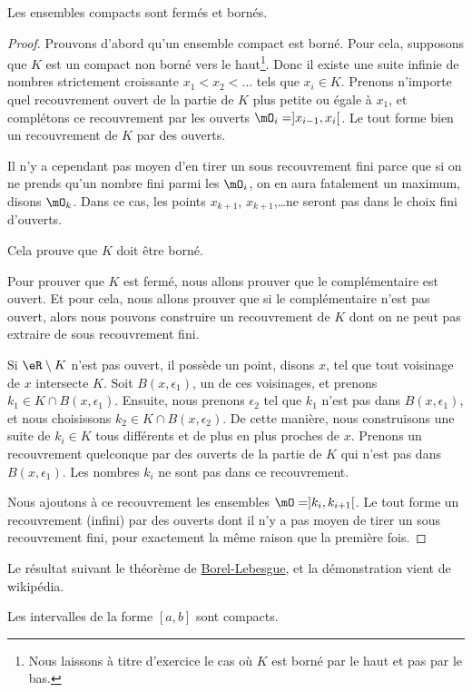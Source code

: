 \begin{proposition}
Les ensembles compacts sont fermés et bornés.
\end{proposition}

\begin{proof}
Prouvons d'abord qu'un ensemble compact est borné. Pour cela, supposons que $K$ est un compact non borné vers le haut\footnote{Nous laissons à titre d'exercice le cas où $K$ est borné par le haut et pas par le bas.}. Donc il existe une suite infinie de nombres strictement croissante $x_1<x_2<\ldots$ tels que $x_i\in K$. Prenons n'importe quel recouvrement ouvert de la partie de $K$ plus petite ou égale à $x_1$, et complétons ce recouvrement par les ouverts $\mO_i=]x_{i-1},x_i[$. Le tout forme bien un recouvrement de $K$ par des ouverts. 

Il n'y a cependant pas moyen d'en tirer un sous recouvrement fini parce que si on ne prends qu'un nombre fini parmi les $\mO_i$, on en aura fatalement un maximum, disons $\mO_k$. Dans ce cas, les points $x_{k+1}$, $x_{k+1}$,\ldots ne seront pas dans le choix fini d'ouverts.

Cela prouve que $K$ doit être borné.

Pour prouver que $K$ est fermé, nous allons prouver que le complémentaire est ouvert. Et pour cela, nous allons prouver que si le complémentaire n'est pas ouvert, alors nous pouvons construire un recouvrement de $K$ dont on ne peut pas extraire de sous recouvrement fini.

Si $\eR\setminus K$ n'est pas ouvert, il possède un point, disons $x$, tel que tout voisinage de $x$ intersecte $K$. Soit $B(x,\epsilon_1)$, un de ces voisinages, et prenons $k_1\in K\cap B(x,\epsilon_1)$. Ensuite, nous prenons $\epsilon_2$ tel que $k_1$ n'est pas dans $B(x,\epsilon_1)$, et nous choisissons $k_2\in K\cap B(x,\epsilon_2)$. De cette manière, nous construisons une suite de $k_i\in K$ tous différents et de plus en plus proches de $x$. Prenons un recouvrement quelconque par des ouverts de la partie de $K$ qui n'est pas dans $B(x,\epsilon_1)$. Les nombres $k_i$ ne sont pas dans ce recouvrement.

Nous ajoutons à ce recouvrement les ensembles $\mO=]k_i,k_{i+1}[$. Le tout forme un recouvrement (infini) par des ouverts dont il n'y a pas moyen de tirer un sous recouvrement fini, pour exactement la même raison que la première fois.
\end{proof}

Le résultat suivant le théorème de \href{http://fr.wikipedia.org/wiki/Théorème_de_Heine-Borel}{Borel-Lebesgue}, et la démonstration vient de wikipédia.
\begin{theorem}   \label{ThoBOrelLebesgue}
    Les intervalles de la forme $[a,b]$ sont compacts.
\end{theorem}

